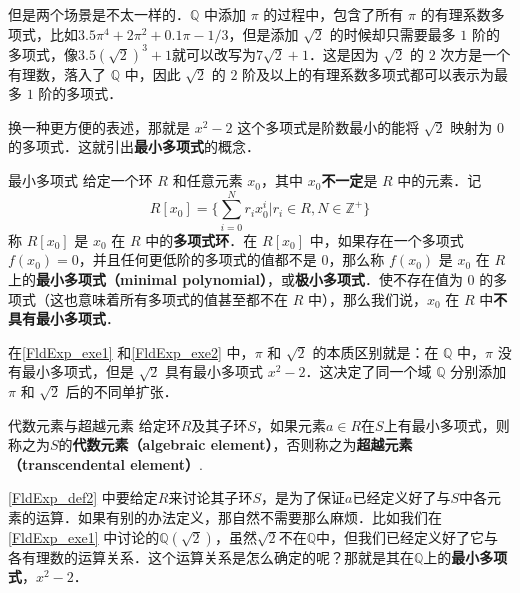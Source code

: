 但是两个场景是不太一样的．$\mathbb{Q}$ 中添加 $\pi$ 的过程中，包含了所有 $\pi$ 的有理系数多项式，比如$3.5\pi^4+2\pi^2+0.1\pi-1/3$，但是添加 $\sqrt{2}$ 的时候却只需要最多 $1$ 阶的多项式，像$3.5(\sqrt{2})^3+1$就可以改写为$7\sqrt{2}+1$．这是因为 $\sqrt{2}$ 的 $2$ 次方是一个有理数，落入了 $\mathbb{Q}$ 中，因此 $\sqrt{2}$ 的 $2$ 阶及以上的有理系数多项式都可以表示为最多 $1$ 阶的多项式．

换一种更方便的表述，那就是 $x^2-2$ 这个多项式是阶数最小的能将 $\sqrt{2}$ 映射为 $0$ 的多项式．这就引出\textbf{最小多项式}的概念．

\begin{definition}{最小多项式}
给定一个环 $R$ 和任意元素 $x_0$，其中 $x_0$\textbf{不一定}是 $R$ 中的元素．记
$$R[x_0]=\{\sum_{i=0}^N r_ix_0^i|r_i\in R, N\in\mathbb{Z}^+\}$$称 $R[x_0]$ 是 $x_0$ 在 $R$ 中的\textbf{多项式环}．在 $R[x_0]$ 中，如果存在一个多项式 $f(x_0)=0$，并且任何更低阶的多项式的值都不是 $0$，那么称 $f(x_0)$ 是 $x_0$ 在 $R$ 上的\textbf{最小多项式（minimal polynomial）}，或\textbf{极小多项式}．使不存在值为 $0$ 的多项式（这也意味着所有多项式的值甚至都不在 $R$ 中），那么我们说，$x_0$ 在 $R$ 中\textbf{不具有最小多项式}．
\end{definition}

在\autoref{FldExp_exe1} 和\autoref{FldExp_exe2} 中，$\pi$ 和 $\sqrt{2}$ 的本质区别就是：在 $\mathbb{Q}$ 中，$\pi$ 没有最小多项式，但是 $\sqrt{2}$ 具有最小多项式 $x^2-2$．这决定了同一个域 $\mathbb{Q}$ 分别添加 $\pi$ 和 $\sqrt{2}$ 后的不同单扩张．

\begin{definition}{代数元素与超越元素}\label{FldExp_def2}
给定环$R$及其子环$S$，如果元素$a\in R$在$S$上有最小多项式，则称之为$S$的\textbf{代数元素（algebraic element）}，否则称之为\textbf{超越元素（transcendental element）}.
\end{definition}

\autoref{FldExp_def2} 中要给定$R$来讨论其子环$S$，是为了保证$a$已经定义好了与$S$中各元素的运算．如果有别的办法定义，那自然不需要那么麻烦．比如我们在\autoref{FldExp_exe1} 中讨论的$\mathbb{Q}(\sqrt{2})$，虽然$\sqrt{2}$不在$\mathbb{Q}$中，但我们已经定义好了它与各有理数的运算关系．这个运算关系是怎么确定的呢？那就是其在$\mathbb{Q}$上的\textbf{最小多项式}，$x^2-2$．







